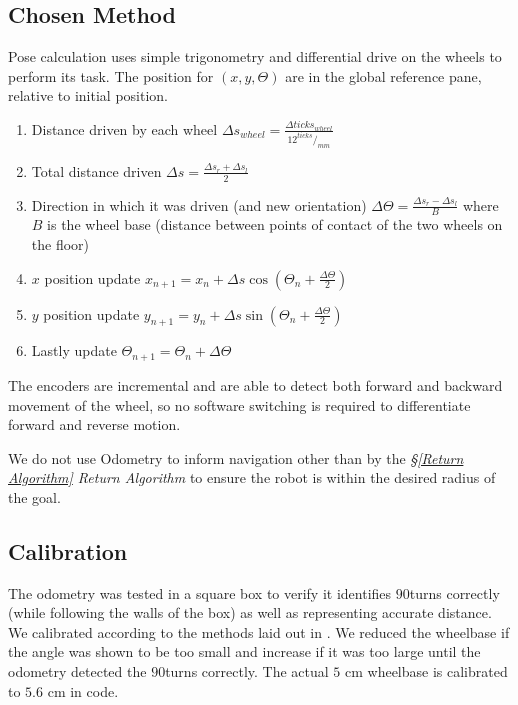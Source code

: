 \documentclass[11pt, a4paper]{article}
\begin{document}
\subsection{Chosen Method}

Pose calculation\cite{odo_used} uses simple trigonometry and differential drive on 
the wheels to perform its task. The position for 
${(x,y,\Theta)}$ are in the global reference pane, relative to initial position.

\begin{enumerate}

	\item Distance driven by each wheel ${\Delta s_{wheel} = \frac {\Delta ticks_{wheel} } {12 ^{ticks}/_{mm}}}$
	\item Total distance driven ${\Delta s = \frac{\Delta s_{r} + \Delta s_{l} }{2}}$
	\item Direction in which it was driven (and new orientation) ${\Delta\Theta = \frac{ \Delta s_{r} - \Delta s_{l} }{B}}$ where $B$ is the wheel base 
	(distance between points of contact of the two wheels on the floor)
	\item $x$ position update ${x_{n+1} = x_{n} + \Delta s \cos (\Theta_n + \frac{\Delta\Theta}{2})}$
	\item $y$ position update ${y_{n+1} = y_{n} + \Delta s \sin (\Theta_n + \frac{\Delta\Theta}{2})}$
        \item Lastly update ${\Theta_{n+1} = \Theta_{n} + \Delta\Theta}$


\end{enumerate}

The encoders are incremental and are able to detect both forward and backward movement 
of the wheel, so no software switching is required to differentiate forward and reverse
motion.

We do not use Odometry to inform navigation other than by the \textit{\S\ref{Return Algorithm}
 Return Algorithm} to ensure the robot is within the desired radius of the goal.

\subsection{Calibration}

The odometry was tested in a square box to verify it identifies $90$\degree turns correctly 
(while following the walls of the box) as well as representing accurate distance. We calibrated 
according to the methods laid out in \cite{odo_calibration}. We reduced the wheelbase if the 
angle was shown to be too small and increase if it was too large until  the odometry detected 
the  $90$\degree turns correctly. The actual $5$ cm wheelbase is calibrated to $5.6$ cm in code.
\end{document}
